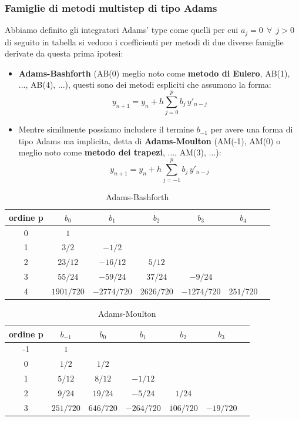 \subsubsection{Famiglie di metodi multistep di tipo Adams}

Abbiamo definito gli integratori Adams' type come quelli per cui $a_j=0\ \ \forall\ \ j>0$ di seguito in tabella si vedono i coefficienti per metodi di due diverse famiglie derivate da questa prima ipotesi:
\begin{itemize}
	\item \textbf{Adams-Bashforth} (AB(0) meglio noto come \textbf{metodo di Eulero}, AB(1), ..., AB(4), ...), questi sono dei metodi espliciti che assumono la forma:
	\begin{equation}\label{eq:Adams-Bashforth}
		\boxed{y_{n+1} = y_n + h \sum_{j=0}^p b_j\, y'_{n-j}}
	\end{equation}
	\item Mentre similmente possiamo includere il termine $b_{-1}$ per avere una forma di tipo Adams ma implicita, detta di \textbf{Adams-Moulton} (AM(-1), AM(0) o meglio noto come \textbf{metodo dei trapezi}, ..., AM(3), ...):
	\begin{equation}\label{eq:Adams-Moulton}
		\boxed{y_{n+1} = y_n + h \sum_{j=-1}^p b_j\, y'_{n-j}}
	\end{equation}
\end{itemize}

\begin{table}[H]
	\centering
	\begin{tabular}{c|cccccc}
		ordine p & $b_0$ & $b_1$ & $b_2$ & $b_3$ & $b_4$ \\ \hline
		0 & $1$ \\ 
		1 & $3/2$ & $-1/2$ \\
		2 & $23/12$ & $-16/12$ & $5/12$ \\
		3 & $55/24$ & $-59/24$ & $37/24$ & $-9/24$ \\
		4 & $1901/720$ & $-2774/720$ & $2626/720$ & $-1274/720$ & $251/720$\\
	\end{tabular}
	\caption{Adams-Bashforth}
	\label{tab:Adams-Bashforth coefficients}
\end{table}

\begin{table}[H]
	\centering
	\begin{tabular}{c|cccccc}
		ordine p & $b_{-1}$ & $b_0$ & $b_1$ & $b_2$ & $b_3$ \\ \hline
		-1 & $1$ \\
		0 & $1/2$ & $1/2$ \\
		1 & $5/12$ & $8/12$ & $-1/12$ \\
		2 & $9/24$ & $19/24$ & $-5/24$ & $1/24$ \\
		3 & $251/720$ & $646/720$ & $-264/720$ & $106/720$ & $-19/720$
	\end{tabular}
	\caption{Adams-Moulton}
	\label{tab:Adams-Moulton coefficients}
\end{table}




